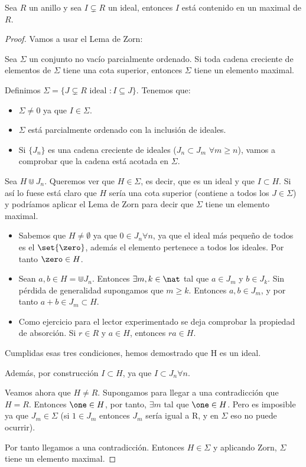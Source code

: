 \begin{theorem}
	Sea $R$ un anillo y sea $I \subsetneq R$ un ideal, entonces $I$ está contenido en un maximal de $R$.
\end{theorem}
\begin{proof}
Vamos a usar el Lema de Zorn:
\begin{lemma}
Sea $\Sigma$ un conjunto no vacío parcialmente ordenado. Si toda cadena creciente de elementos de $\Sigma$ tiene una cota superior, entonces $\Sigma$ tiene un elemento maximal.
\end{lemma}
	
Definimos $\Sigma = \{J \subsetneq R \text{ ideal }: I\subseteq J \}$. Tenemos que:
\begin{itemize}
	\item $\Sigma \neq 0$ ya que $I \in \Sigma$.
	\item $\Sigma$ está parcialmente ordenado con la inclusión de ideales.
	\item Si $\{ J_n\}$ es una cadena creciente de ideales ($J_n \subset J_m$ $\forall m\geq n$), vamos a comprobar que la cadena está acotada en $\Sigma$.
\end{itemize}
Sea $H \Cup J_n$. Queremos ver que $H \in \Sigma$, es decir, que es un ideal y que $I \subset H$. Si así lo fuese está claro que $H$ sería una cota superior (contiene a todos los $J \in \Sigma$) y podríamos aplicar el Lema de Zorn para decir que $\Sigma$ tiene un elemento maximal.

\begin{itemize}
	\item Sabemos que $H \neq \emptyset$ ya que $0 \in J_n \forall n$, ya que el ideal más pequeño de todos es el $\set{\zero}$, además el elemento \zero pertenece a todos los ideales. Por tanto $\zero \in H$.
	\item Sean $a,b \in H=\Cup J_n$.  Entonces $\exists m,k \in \nat$ tal que $a \in J_m$ y $b \in J_k$. Sin pérdida de generalidad supongamos que $m \geq k$. Entonces $a,b \in J_m$, y por tanto $a+b \in J_m \subset H$.
	\item Como ejercicio para el lector experimentado se deja comprobar la propiedad de absorción. Si $r\in R$ y $a \in H$, entonces $ra \in H$.
\end{itemize}
Cumplidas esas tres condiciones, hemos demostrado que H es un ideal.

Además, por construcción $I \subset H$, ya que $I \subset J_n \forall n$.

Veamos ahora que $H \neq R$. Supongamos para llegar a una contradicción que $H=R$. Entonces $\one \in H$, por tanto, $\exists m$ tal que $\one \in H$. Pero es imposible ya que $J_m \in \Sigma$ (si $1 \in J_m$ entonces $J_m$ sería igual a R, y en $\Sigma$ eso no puede ocurrir). 

Por tanto llegamos a una contradicción. Entonces $H \in \Sigma$ y aplicando Zorn, $\Sigma$ tiene un elemento maximal.
\end{proof}


